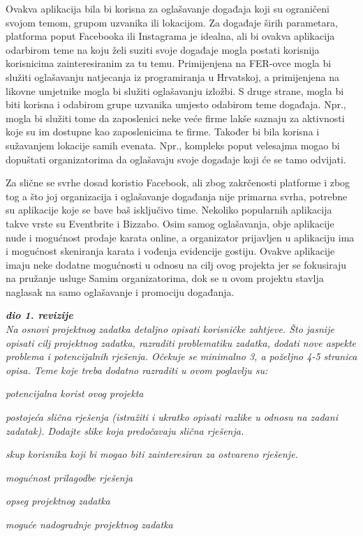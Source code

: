 Ovakva aplikacija bila bi korisna za oglašavanje događaja koji su ograničeni svojom temom, grupom uzvanika ili lokacijom. Za događaje širih parametara, platforma poput Facebooka ili Instagrama je idealna, ali bi ovakva aplikacija odarbirom teme na koju želi suziti svoje događaje mogla postati korisnija korisnicima zainteresiranim za tu temu. Primijenjena na FER-ovce mogla bi služiti oglašavanju natjecanja iz programiranja u Hrvatskoj, a primijenjena na likovne umjetnike mogla bi služiti oglašavanju izložbi. S druge strane, mogla bi biti korisna i odabirom grupe uzvanika umjesto odabirom teme događaja. Npr., mogla bi služiti tome da zaposlenici neke veće firme lakše saznaju za aktivnosti koje su im dostupne kao zaposlenicima te firme. Također bi bila korisna i sužavanjem lokacije samih evenata. Npr., kompleks poput velesajma mogao bi dopuštati organizatorima da oglašavaju svoje događaje koji će se tamo odvijati.

Za slične se svrhe dosad koristio Facebook, ali zbog zakrčenosti platforme i zbog tog a što joj organizacija i oglašavanje događanja nije primarna svrha, potrebne su aplikacije koje se bave baš isključivo time. Nekoliko popularnih aplikacija takve vrste su Eventbrite i Bizzabo. Osim samog oglašavanja, obje aplikacije nude i mogućnost prodaje karata online, a organizator prijavljen u aplikaciju ima i mogućnost skeniranja karata i vođenja evidencije gostiju. Ovakve aplikacije imaju neke dodatne mogućnosti u odnosu na cilj ovog projekta jer se fokusiraju na pružanje usluge Samim organizatorima, dok se u ovom projektu stavlja naglasak na samo oglašavanje i promociju događanja.
			
		
		\textbf{\textit{dio 1. revizije}}\\
		
		\textit{Na osnovi projektnog zadatka detaljno opisati korisničke zahtjeve. Što jasnije opisati cilj projektnog zadatka, razraditi problematiku zadatka, dodati nove aspekte problema i potencijalnih rješenja. Očekuje se minimalno 3, a poželjno 4-5 stranica opisa.	Teme koje treba dodatno razraditi u ovom poglavlju su:}
		\begin{packed_item}
			\item \textit{potencijalna korist ovog projekta}
			\item \textit{postojeća slična rješenja (istražiti i ukratko opisati razlike u odnosu na zadani zadatak). Dodajte slike koja predočavaju slična rješenja.}
			\item \textit{skup korisnika koji bi mogao biti zainteresiran za ostvareno rješenje.}
			\item \textit{mogućnost prilagodbe rješenja }
			\item \textit{opseg projektnog zadatka}
			\item \textit{moguće nadogradnje projektnog zadatka}
		\end{packed_item}
		
